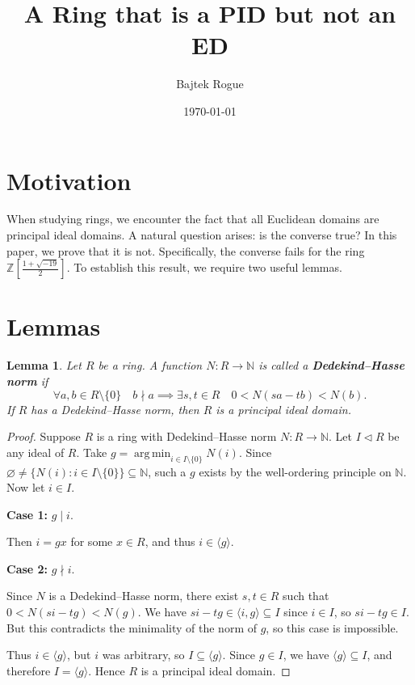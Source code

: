 \documentclass[a4paper,12pt]{report}
\title{A Ring that is a PID but not an ED}
\author{Bajtek Rogue}
\date{\today}
\newtheorem{lemma}{Lemma}
\newcommand{\argmin}{\operatorname*{arg\,min}}
\begin{document}
\maketitle

\section*{Motivation}

When studying rings, we encounter the fact that all Euclidean domains are principal ideal domains. A natural question arises: is the converse true? In this paper, we prove that it is not. Specifically, the converse fails for the ring $\mathbb{Z}\left[\frac{1+\sqrt{-19}}{2}\right]$. To establish this result, we require two useful lemmas.

\section*{Lemmas}

\begin{lemma}\label{lem:dh_norm}
    Let $R$ be a ring. A function $N:R\to\mathbb{N}$ is called a \textbf{Dedekind--Hasse norm} if 
    \[
        \forall a,b\in R\setminus\{0\} \quad b\nmid a\implies \exists s,t\in R\quad 0<N(sa-tb)<N(b).
    \]
    If $R$ has a Dedekind--Hasse norm, then $R$ is a principal ideal domain.
\end{lemma}
\begin{proof}
    Suppose $R$ is a ring with Dedekind--Hasse norm $N:R\to\mathbb{N}$. Let $I\triangleleft R$ be any ideal of $R$. Take $g=\argmin_{i\in I\setminus\{0\}} N(i)$. Since $\varnothing\neq \{N(i):i\in I\setminus\{0\}\}\subseteq\mathbb{N}$, such a $g$ exists by the well-ordering principle on $\mathbb{N}$. Now let $i\in I$.
    
    \medskip
    \noindent\textbf{Case 1:} $g\mid i$.
    
    Then $i=gx$ for some $x\in R$, and thus $i\in \langle g \rangle$.
    
    \medskip
    \noindent\textbf{Case 2:} $g\nmid i$.
    
    Since $N$ is a Dedekind--Hasse norm, there exist $s,t\in R$ such that $0<N(si-tg)<N(g)$.
    We have $si-tg\in \langle i,g \rangle \subseteq I$ since $i\in I$, so $si-tg\in I$. But this contradicts the minimality of the norm of $g$, so this case is impossible.
    
    \medskip
    Thus $i\in \langle g \rangle$, but $i$ was arbitrary, so $I\subseteq\langle g \rangle$. Since $g\in I$, we have $\langle g\rangle\subseteq I$, and therefore $I=\langle g\rangle$. Hence $R$ is a principal ideal domain.
\end{proof}
\end{document}
